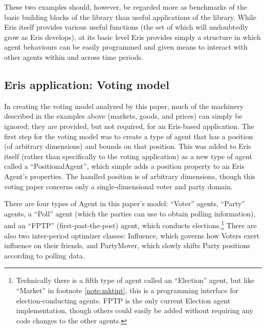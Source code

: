 \documentclass[12pt]{article}
\numberwithin{equation}{subsection}
\begin{document}
These two examples should, however, be regarded more as benchmarks of the basic building blocks of
the library than useful applications of the library.  While Eris itself provides various useful
functions (the set of which will undoubtedly grow as Eris develops), at its basic level Eris
provides simply a structure in which agent behaviours can be easily programmed and given means to
interact with other agents within and across time periods.

\subsection{Eris application: Voting model}\label{ss:voting}

In creating the voting model analyzed by this paper, much of the machinery described in the examples
above (markets, goods, and prices) can simply be ignored; they are provided, but not required, for
an Eris-based application.  The first step for the voting model was to create a type of agent that
has a position (of arbitrary dimensions) and bounds on that position.  This was added to Eris itself
(rather than specifically to the voting application) as a new type of agent called a
``PositionalAgent'', which simple adds a position property to an Eris Agent's properties.  The
handled position is of arbitrary dimensions, though this voting paper concerns only a
single-dimensional voter and party domain.

There are four types of Agent in this paper's model: ``Voter'' agents, ``Party'' agents, a ``Poll''
agent (which the parties can use to obtain polling information), and an ``FPTP''
(first-past-the-post) agent, which conducts elections.\footnote{Technically there is a fifth type of
    agent called an ``Election'' agent, but like ``Market'' in footnote \ref{note:mktint}, this is a
    programming interface for election-conducting agents.  FPTP is the only current Election agent
    implementation, though others could easily be added without requiring any code changes to the other
    agents.
}  There are also two inter-period optimizer classes: Influence, which governs how Voters exert
influence on their friends, and PartyMover, which slowly shifts Party positions according to polling
data.
\end{document}
